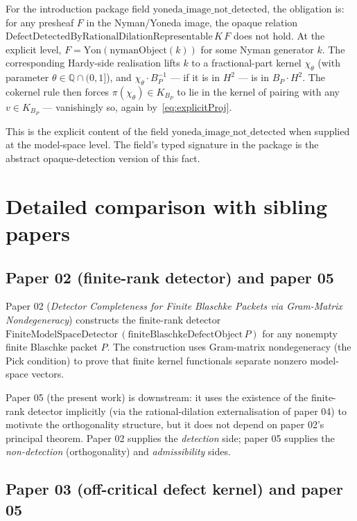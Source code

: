 \documentclass[12pt]{article}
\theoremstyle{definition}
\theoremstyle{remark}
\newcommand{\HardyTwo}{H^{2}}
\newcommand{\BS}{B}
\newcommand{\KBP}{K_{B_{P}}}
\newcommand{\Yon}{\mathrm{Yon}}
\begin{document}
For the introduction package field $\mathrm{yoneda\_image\_not\_detected}$, the obligation is: for any presheaf $F$ in the Nyman/Yoneda image, the opaque relation $\mathrm{DefectDetectedByRationalDilationRepresentable}\,K\,F$ does not hold. At the explicit level, $F = \Yon(\mathrm{nymanObject}(k))$ for some Nyman generator $k$. The corresponding Hardy-side realisation lifts $k$ to a fractional-part kernel $\chi_{\theta}$ (with parameter $\theta \in \mathbb{Q} \cap (0, 1]$), and $\chi_{\theta} \cdot \BS_{P}^{-1}$ --- if it is in $\HardyTwo$ --- is in $\BS_{P} \cdot \HardyTwo$. The cokernel rule then forces $\pi(\chi_{\theta}) \in \KBP$ to lie in the kernel of pairing with any $v \in \KBP$ --- vanishingly so, again by~\eqref{eq:explicitProj}.

This is the explicit content of the field $\mathrm{yoneda\_image\_not\_detected}$ when supplied at the model-space level. The field's typed signature in the package is the abstract opaque-detection version of this fact.

\section{Detailed comparison with sibling papers}\label{sec:comparison}

\subsection{Paper 02 (finite-rank detector) and paper 05}

Paper 02 (\textit{Detector Completeness for Finite Blaschke Packets via Gram-Matrix Nondegeneracy}) constructs the finite-rank detector $\mathrm{FiniteModelSpaceDetector}\,(\mathrm{finiteBlaschkeDefectObject}\,P)$ for any nonempty finite Blaschke packet $P$. The construction uses Gram-matrix nondegeneracy (the Pick condition) to prove that finite kernel functionals separate nonzero model-space vectors.

Paper 05 (the present work) is downstream: it uses the existence of the finite-rank detector implicitly (via the rational-dilation externalisation of paper 04) to motivate the orthogonality structure, but it does not depend on paper 02's principal theorem. Paper 02 supplies the \emph{detection} side; paper 05 supplies the \emph{non-detection} (orthogonality) and \emph{admissibility} sides.

\subsection{Paper 03 (off-critical defect kernel) and paper 05}
\end{document}
